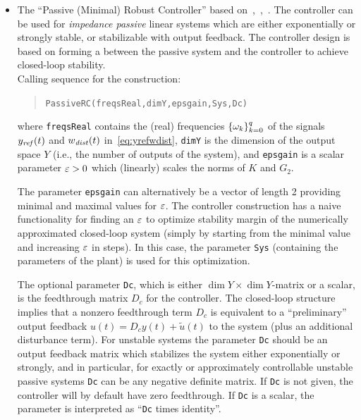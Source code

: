 \documentclass[11pt, a4paper]{amsart}
\newcommand{\CL}{C_\Lambda}
\theoremstyle{definition}
\numberwithin{equation}{section}
\newcommand{\yref}{y_{\mbox{\scriptsize\textit{ref}}}}
\newcommand{\wdist}{w_{\mbox{\scriptsize\textit{dist}}}}
\begin{document}
\begin{itemize}
	\bigskip

  \item The ``Passive (Minimal) Robust Controller'' based on~,~,~\cite{PauLeG22}. 
The controller can be used for \emph{impedance passive} linear systems which are either exponentially or strongly stable, or stabilizable with output feedback.
The controller design is based on forming a  between the passive system and the controller  to achieve closed-loop stability.\\[1ex]
      Calling sequence for the construction:\\[-1ex]
     \begin{quotation}
	 \texttt{PassiveRC(freqsReal,dimY,epsgain,Sys,Dc)}
     \end{quotation}
     \medskip
     where
     \texttt{freqsReal} contains the (real) frequencies $\{\omega_k\}_{k=0}^q$ of the signals $\yref(t)$ and $\wdist(t)$ in~\eqref{eq:yrefwdist}, \texttt{dimY} is the dimension of the output space $Y$ (i.e., the number of outputs of the system), and  \texttt{epsgain} is a scalar parameter $\varepsilon>0$ which (linearly) scales the norms of $K$ and $G_2$.


The parameter \texttt{epsgain} can alternatively be a vector of length 2 providing minimal and maximal values for $\varepsilon$. The controller construction has a naive functionality for finding an $\varepsilon$ to optimize stability margin of the numerically approximated closed-loop system (simply by starting from the minimal value and increasing $\varepsilon$ in steps). In this case, the parameter \texttt{Sys} (containing the parameters of the plant) is used for this optimization.

The optional parameter \texttt{Dc}, which is either $\dim Y\times \dim Y$-matrix or a scalar, is the feedthrough matrix $D_c$ 
for the controller. The closed-loop structure implies that a nonzero feedthrough term $D_c$ is equivalent to a 
 ``preliminary'' output feedback  $u(t)=D_c y(t)+ \tilde{u}(t)$ to the system (plus an additional disturbance term). For unstable systems the parameter \texttt{Dc} should be an output feedback matrix which stabilizes the system either exponentially or strongly, and in particular,
for exactly or approximately controllable unstable passive systems \texttt{Dc} can be any negative definite matrix.
If \texttt{Dc} is not given, the controller will by default have zero feedthrough.
If \texttt{Dc} is a scalar, the parameter is
interpreted as ``\texttt{Dc} times identity''.


\end{itemize}
\end{document}
